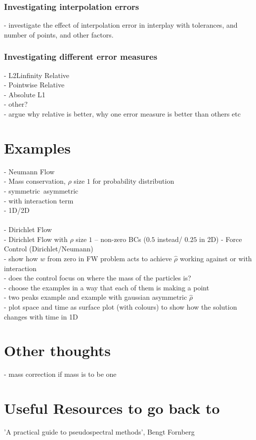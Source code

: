 \documentclass[11pt, a4paper]{article}
\theoremstyle{definition}
\begin{document}
\subsubsection{Investigating interpolation errors}
- investigate the effect of interpolation error in interplay with tolerances, and number of points, and other factors.
\subsubsection{Investigating different error measures}
- L2Linfinity Relative\\
- Pointwise Relative\\
- Absolute L1\\
- other?\\
- argue why relative is better, why one error measure is better than others etc

\section{Examples}
- Neumann Flow\\
- Mass conservation, $\rho$ size $1$ for probability distribution\\
- symmetric\ asymmetric\\
- with interaction term \\
- 1D/2D \\
\\
- Dirichlet Flow \\
- Dirichlet Flow with $\rho$ size $1$ -- non-zero BCs ($0.5$ instead/ $0.25$ in 2D)
- Force Control (Dirichlet/Neumann) \\
- show how $w$ from zero in FW problem acts to achieve $\hat \rho$ working against or with interaction\\
- does the control focus on where the mass of the particles is?\\
- choose the examples in a way that each of them is making a point\\
- two peaks example and example with gaussian asymmetric $\hat \rho$\\
- plot space and time as surface plot (with colours) to show how the solution changes with time in 1D


\section{Other thoughts}
- mass correction if mass is to be one\\


\section{Useful Resources to go back to}
'A practical guide to pseudospectral methods', Bengt Fornberg
\end{document}
